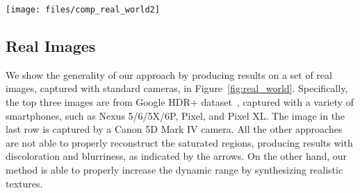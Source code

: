 \begin{figure*}
  \texttt{[image: files/comp\_real\_world2]}
  \vspace{-0.30in}
  \caption{Comparison against state-of-the-art approaches on images captured by standard cameras. Zoom in to the electronic version to see the differences.}
  \vspace{-0.2in}
  \label{fig:real_world}
\end{figure*}

\subsection{Real Images}
We show the generality of our approach by producing results on a set of real images, captured with standard cameras, in Figure~\ref{fig:real_world}. Specifically, the top three images are from Google HDR+ dataset~\cite{hasinoff2016burst}, captured with a variety of smartphones, such as Nexus 5/6/5X/6P, Pixel, and Pixel XL. The image in the last row is captured by a Canon 5D Mark IV camera. All the other approaches are not able to properly reconstruct the saturated regions, producing results with discoloration and blurriness, as indicated by the arrows. On the other hand, our method is able to properly increase the dynamic range by synthesizing realistic textures.














